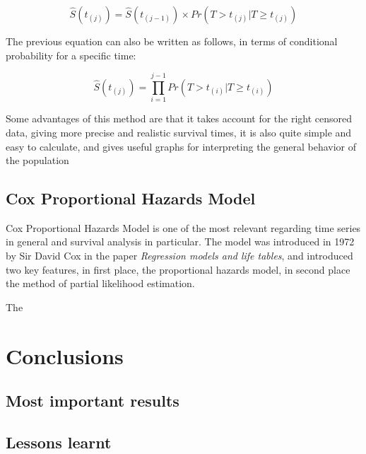 \documentclass[11pt]{article} %
\begin{document}
    \begin{equation}
      \hat{S}(t_{(j)}) = \hat{S}(t_{(j-1)}) \times Pr(T>t_{(j)}|T \geq t_{(j)})
      \label{eq:KM-eq-surv}
    \end{equation}

    The previous equation can also be written as follows, in terms of conditional probability for a specific time:

    \begin{equation}
      \hat{S}(t_{(j)}) = \prod_{i=1}^{j-1} Pr(T>t_{(i)}|T\geq t_{(i)})
      \label{eq:KM-eq-probab}
    \end{equation}

    Some advantages of this method are that it takes account for the right censored data, giving more precise and realistic survival times, it is also quite simple and easy to calculate, and gives useful graphs for interpreting the general behavior of the population


  \subsection{Cox Proportional Hazards Model}

    Cox Proportional Hazards Model is one of the most relevant regarding time series in general and survival analysis in particular. The model was introduced in 1972 by Sir David Cox in the paper \emph{Regression models and life tables}, and introduced two key features, in first place, the proportional hazards model, in second place the method of partial likelihood estimation.

    The

\section{Conclusions}
  \label{sec:conclusions}

  \subsection{Most important results}

  \subsection{Lessons learnt}

\nocite{tungsten_databricks, big_data_analytics_spark}
\printbibliography
\end{document}
